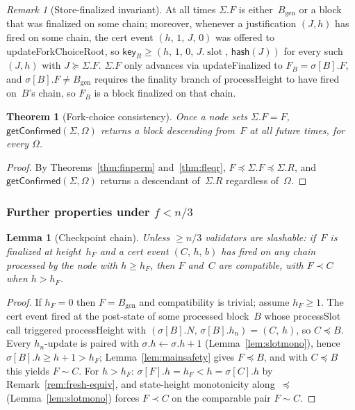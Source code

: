 \documentclass{article}
\newcommand{\genesis}{\ensuremath{B_{\mathrm{gen}}}}
\newcommand{\slot}[0]{\ensuremath{\operatorname{\mathrm{slot}}}}
\newcommand{\hash}{\mathsf{hash}}
\newcommand{\key}{\mathsf{key}}
\newcommand{\processSlot}{\textsf{processSlot}\xspace}
\newcommand{\processHeight}{\textsf{processHeight}\xspace}
\newcommand{\updateForkChoiceRoot}{\textsf{updateForkChoiceRoot}\xspace}
\newcommand{\updateFinalized}{\textsf{updateFinalized}\xspace}
\newcommand{\getConfirmed}{\textsf{getConfirmed}\xspace}
\theoremstyle{plain}
\newtheorem{theorem}{Theorem}
\newtheorem{lemma}{Lemma}
\theoremstyle{definition}
\theoremstyle{remark}
\newtheorem{remark}{Remark}
\begin{document}
\begin{remark}[Store-finalized invariant]\label{rem:fs-invariant}
At all times $\Sigma.F$ is either~$\genesis$ or a block that was finalized on some chain; moreover, whenever a justification $(J, h)$ has fired on some chain, the cert event $(h,\, 1,\, J,\, 0)$ was offered to \updateForkChoiceRoot, so $\key_R \geq (h,\, 1,\, 0,\, J.\slot,\, \hash(J))$ for every such~$(J, h)$ with $J \succeq \Sigma.F$.
$\Sigma.F$ only advances via \updateFinalized to $F_B = \sigma[B].F$, and $\sigma[B].F \neq \genesis$ requires the finality branch of \processHeight to have fired on~$B$'s chain, so $F_B$ is a block finalized on that chain.
\end{remark}

\begin{theorem}[Fork-choice consistency]\label{thm:fcconsistency}
Once a node sets $\Sigma.F = F$, $\getConfirmed(\Sigma, \Omega)$ returns a block descending from~$F$ at all future times, for every $\Omega$.
\end{theorem}

\begin{proof}
By Theorems~\ref{thm:finperm} and~\ref{thm:fleqr}, $F \preceq \Sigma.F \preceq \Sigma.R$, and $\getConfirmed(\Sigma, \Omega)$ returns a descendant of~$\Sigma.R$ regardless of~$\Omega$.
\end{proof}

\subsubsection*{Further properties under $f < n/3$}

\begin{lemma}[Checkpoint chain]\label{lem:certchain}
Unless $\geq n/3$ validators are slashable: if~$F$ is finalized at height~$h_F$ and a cert event $(C,\, h,\, b)$ has fired on any chain processed by the node with $h \geq h_F$, then $F$ and~$C$ are compatible, with $F \prec C$ when $h > h_F$.
\end{lemma}

\begin{proof}
If $h_F = 0$ then $F = \genesis$ and compatibility is trivial; assume $h_F \geq 1$.
The cert event fired at the post-state of some processed block~$B$ whose \processSlot call triggered \processHeight with $(\sigma[B].N,\, \sigma[B].h_n) = (C,\, h)$, so $C \preceq B$.
Every $h_n$-update is paired with $\sigma.h \gets \sigma.h + 1$ (Lemma~\ref{lem:slotmono}), hence $\sigma[B].h \geq h + 1 > h_F$; Lemma~\ref{lem:mainsafety} gives $F \preceq B$, and with $C \preceq B$ this yields $F \sim C$.
For $h > h_F$: $\sigma[F].h = h_F < h = \sigma[C].h$ by Remark~\ref{rem:fresh-equiv}, and state-height monotonicity along~$\preceq$ (Lemma~\ref{lem:slotmono}) forces $F \prec C$ on the comparable pair $F \sim C$.
\end{proof}
\end{document}
